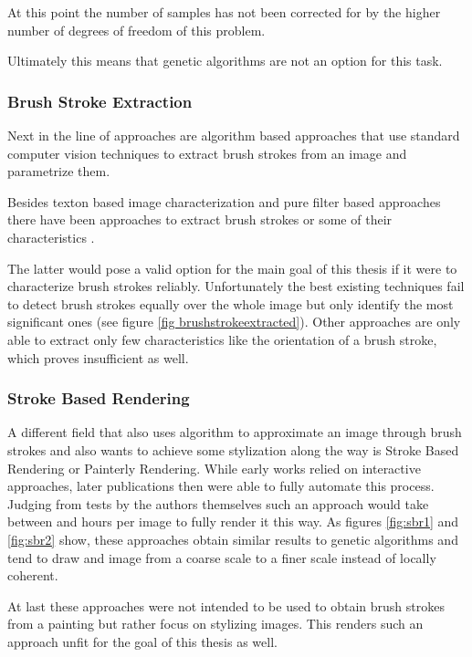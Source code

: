 At this point the number of samples has not been corrected for by the higher number of
degrees of freedom of this problem.

Ultimately this means that genetic algorithms are not an option for this task.

\subsubsection{Brush Stroke Extraction}
Next in the line of approaches are algorithm based approaches that use standard
computer vision techniques to extract brush strokes from an image and parametrize them.

Besides texton based image characterization \cite{textons} and pure filter based
approaches \cite{filters} there have been approaches to extract brush strokes or
some of their characteristics \cite{brushstrokecharacteristics} \cite{brushstrokeextraction}.

The latter would pose a valid option for the main goal of this thesis if it were to
characterize brush strokes reliably.
Unfortunately the best existing techniques fail to detect brush strokes equally 
over the whole image but only identify the most significant ones (see figure \ref{fig brushstrokeextracted}).
Other approaches are only able to extract only few characteristics like the orientation
of a brush stroke, which proves insufficient as well.

\subsubsection{Stroke Based Rendering}
A different field that also uses algorithm to approximate an image through brush strokes
and also wants to achieve some stylization along the way is Stroke Based Rendering
or Painterly Rendering.
While early works relied on interactive approaches, later publications then were able
to fully automate this process.
Judging from tests by the authors themselves such an approach would take between 
and  hours per image to fully render it this way.
As figures \ref{fig:sbr1} and \ref{fig:sbr2} show, these approaches obtain similar
results to genetic algorithms and tend to draw and image from a coarse scale to a finer scale
instead of locally coherent.

At last these approaches were not intended to be used to obtain brush strokes from
a painting but rather focus on stylizing images.
This renders such an approach unfit for the goal of this thesis as well.

